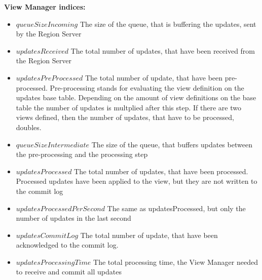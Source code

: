 \documentclass[11pt,a4paper,bibtotoc,idxtotoc,headsepline,footsepline,footexclude,BCOR12mm,DIV13]{scrbook}
\begin{document}
\textbf{View Manager indices:}
\begin{itemize}
	\item $queueSizeIncoming$ The size of the queue, that is buffering the updates, sent by the Region Server
	\item $updatesReceived$ The total number of updates, that have been received from the Region Server
	\item $updatesPreProcessed$ The total number of update, that have been pre-processed. Pre-processing stands for evaluating the view definition on the updates base table. Depending on the amount of view definitions on the base table the number of updates is multplied after this step. If there are two views defined, then the number of updates, that have to be processed, doubles.
	\item $queueSizeIntermediate$ The size of the queue, that buffers updates between the pre-processing and the processing step
	\item $updatesProcessed$ The total number of updates, that have been processed. Processed updates have been applied to the view, but they are not written to the commit log 
	\item $updatesProcessedPerSecond$ The same as updatesProcessed, but only the number of updates in the last second
	\item $updatesCommitLog$ The total number of update, that have been acknowledged to the commit log.
	\item $updatesProcessingTime$ The total processing time, the View Manager needed to receive and commit all updates
	
\end{itemize}
\end{document}
